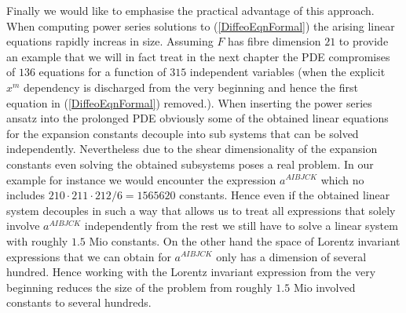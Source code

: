 \documentclass[a4paper,12pt, DIV=14, BCOR=5mm, twoside, headsepline]{scrbook}
\begin{document}
Finally we would like to emphasise the practical advantage of this approach. When computing power series solutions to (\ref{DiffeoEqnFormal}) the arising linear equations rapidly increas in size. Assuming $F$ has fibre dimension $21$ to provide an example that we will in fact treat in the next chapter the PDE compromises of $136$ equations for a function of $315$ independent variables (when the explicit $x^m$ dependency is discharged from the very beginning and hence the first equation in (\ref{DiffeoEqnFormal}) removed.).  When inserting the power series ansatz into the prolonged PDE obviously some of the obtained linear equations for the expansion constants decouple into sub systems that can be solved independently. Nevertheless due to the shear dimensionality of the expansion constants even solving the obtained subsystems poses a real problem. In our example for instance we would encounter the expression $a^{AIBJCK}$ which no includes $210\cdot 211\cdot212/6=1565620$ constants. Hence even if the obtained linear system decouples in such a way that allows us to treat all expressions that solely involve $a^{AIBJCK}$ independently from the rest we still have to solve a linear system with roughly $1.5$ Mio constants. On the other hand the space of Lorentz invariant expressions that we can obtain for $a^{AIBJCK}$ only has a dimension of several hundred. Hence working with the Lorentz invariant expression from the very beginning reduces the size of the problem from roughly $1.5$ Mio involved constants to several hundreds. 
\end{document}
